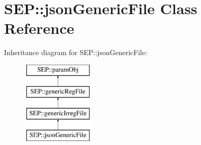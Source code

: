 \hypertarget{class_s_e_p_1_1json_generic_file}{}\section{S\+EP\+:\+:json\+Generic\+File Class Reference}
\label{class_s_e_p_1_1json_generic_file}
Inheritance diagram for S\+EP\+:\+:json\+Generic\+File\+:\begin{figure}[H]
\begin{center}
\leavevmode
\includegraphics[height=4.000000cm]{class_s_e_p_1_1json_generic_file}
\end{center}
\end{figure}
